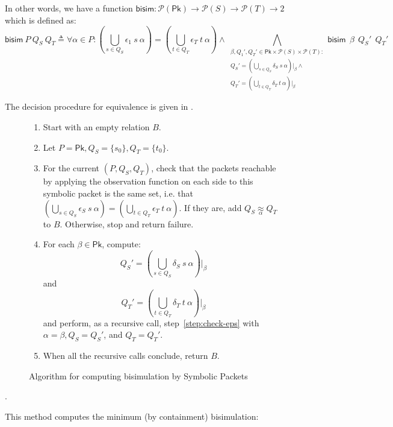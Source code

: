 \documentclass[acmsmall,dvipsnames,nonacm]{acmart}
\newcommand\Pk{\mathsf{Pk}}
\newcommand\pk{\alpha}
\newcommand\pkp{\beta}
\newcommand\bisim{\mathsf{bisim}}
\newcommand{\approxp}[1]{\underset{#1}\approx}
\begin{document}
In other words, we have a function
$\bisim\colon \mathcal{P}(\Pk) \to \mathcal{P}(S) \to \mathcal{P}(T) \to 2$
which is defined as:
\[
\bisim\ P\ Q_S\ Q_T \triangleq
            \forall \pk\in P\colon (\bigcup_{s\in Q_S} \epsilon_1\ s\ \pk) =
                                   (\bigcup_{t\in Q_T} \epsilon_T\ t\ \pk) \wedge
            \bigwedge_{\substack{\pkp,Q_1', Q_T' \in \Pk \times  \mathcal{P}(S) \times \mathcal{P}(T)\colon \\
                        Q_S' = (\bigcup_{s\in Q_S} \delta_S\ s\ \pk)\vert_{\pkp} \wedge \\
                        Q_T' = (\bigcup_{t\in Q_T} \delta_T\ t\ \pk)\vert_{\pkp}}} \bisim\ \ \pkp\ \ Q_S'\ \ Q_T'
\]

The decision procedure for equivalence is given in .

\begin{figure}
\begin{enumerate}
\item Start with an empty relation $B$.
\item \label{step:init} Let $P=\Pk, Q_S = \{s_0\}, Q_T = \{t_0\}$.
\item \label{step:check-eps} For the current $(P, Q_S, Q_T)$, check that the packets reachable by applying the
observation function on each side to this symbolic packet is the same set, i.e.
that $(\bigcup_{s\in Q_S} \epsilon_S\ s\ \pk) = (\bigcup_{t\in Q_T} \epsilon_T\ t\ \pk)$.
If they are, add $Q_S \approxp{\pk} Q_T$ to $B$. Otherwise, stop and return
failure.
\item \label{step:iter-delta} For each $\pkp\in\Pk$, compute:
\[
Q_S' = (\bigcup_{s\in Q_S} \delta_S\ s\ \pk)\vert_{\pkp}
\] and \[
Q_T' = (\bigcup_{t\in Q_T} \delta_T\ t\ \pk)\vert_{\pkp}
\]
and perform, as a recursive call, step~\ref{step:check-eps} with $\pk=\pkp,
Q_S=Q_S'$, and $Q_T=Q_T'$.
\item When all the recursive calls conclude, return $B$.
\end{enumerate}
\caption{Algorithm for computing bisimulation by Symbolic
Packets}\label{fig:sym-pack-alg}
\end{figure}.


This method computes the minimum (by containment) bisimulation:
\end{document}
